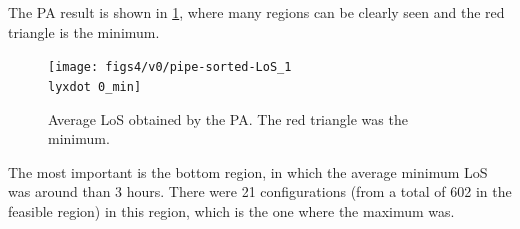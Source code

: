 The PA result is shown in \ref{subfig:pipe17-1}, where many regions
can be clearly seen and the red triangle is the minimum.
\begin{figure}[H]
\noindent \begin{centering}
\texttt{[image: figs4/v0/pipe-sorted-LoS\_1\\lyxdot 0\_min]}
\par\end{centering}

\caption{Average LoS obtained by the PA. The red triangle was the minimum.
\label{subfig:pipe17-1}}
\end{figure}
 The most important is the bottom region, in which the average minimum
LoS was around than 3 hours. There were 21 configurations (from a
total of 602 in the feasible region) in this region, which is the
one where the maximum was.

